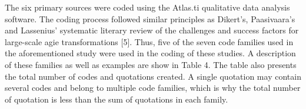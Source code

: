 The six primary sources were coded using the Atlas.ti qualitative data
analysis software. The coding process followed similar principles as
Dikert's, Paasivaara's and Lassenius' systematic literary review of the
challenges and success factors for large-scale agie transformations
[5]. Thus, five of the seven code families used in the aforementioned
study were used in the coding of these studies. A description of
these families as well as examples are show in Table 4. The table
also presents the total number of codes and quotations created. A
single quotation may contain several codes and belong to multiple code
families, which is why the total number of quotation is less than the
sum of quotations in each family.


